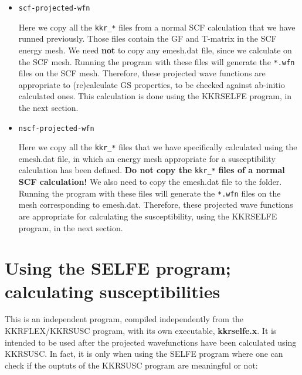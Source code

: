 \documentclass[a4paper,10pt,fullpage]{report}
\begin{document}
\begin{itemize}

\item \verb|scf-projected-wfn| 

Here we copy all the \verb|kkr_*| files from a normal SCF calculation 
that we have runned previously. Those files contain the GF and T-matrix
in the SCF energy mesh. We need \textbf{not} to copy any emesh.dat file,
since we calculate on the SCF mesh. Running the program with these files 
will generate the \verb|*.wfn|
files on the SCF mesh. Therefore, these projected wave functions are appropriate
to (re)calculate GS properties, to be checked against ab-initio calculated ones.
This calculation is done using the KKRSELFE program, in the next section.

\item \verb|nscf-projected-wfn| 

Here we copy all the \verb|kkr_*| files that we have specifically 
calculated using the emesh.dat file, in which an energy mesh appropriate
for a susceptibility calculation has been defined. 
\textbf{Do not copy the} \verb|kkr_*| \textbf{files of a normal SCF calculation!}
We also need to copy the
emesh.dat file to the folder. Running the program with these files
will generate the \verb|*.wfn|
files on the mesh corresponding to emesh.dat. Therefore, these projected wave 
functions are appropriate for calculating the susceptibility, 
using the KKRSELFE program, in the next section.

\end{itemize}





\section{Using the SELFE  program; calculating susceptibilities}

This is an independent program, compiled independently from the KKRFLEX/KKRSUSC program,
with its own executable, \textbf{kkrselfe.x}. It is intended to be used after the 
projected wavefunctions have been calculated using KKRSUSC. In fact, 
it is only when using the SELFE program where one can check if the ouptuts
of the KKRSUSC program are meaningful or not:
\end{document}
